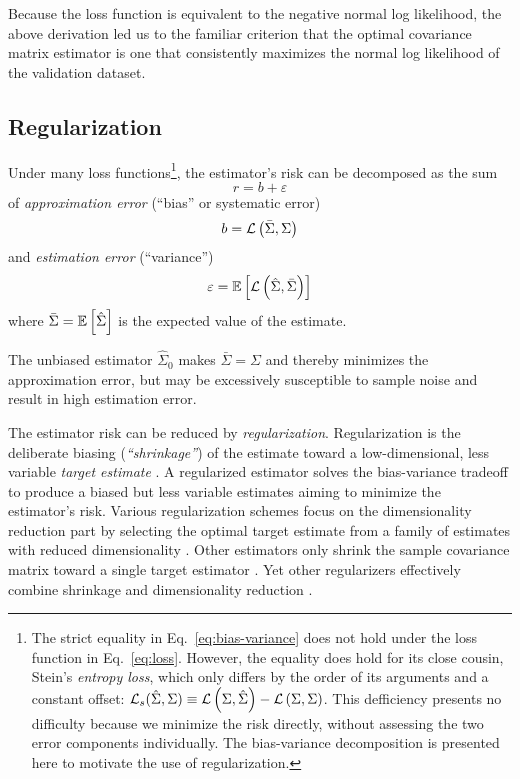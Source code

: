 Because the loss function is equivalent to the negative normal log likelihood, the above derivation led us to the familiar criterion that the optimal covariance matrix estimator is one that consistently maximizes the normal log likelihood of the validation dataset.

\subsection*{Regularization}
Under many loss functions\footnote{
The strict equality in Eq.~\ref{eq:bias-variance} does not hold under the loss function in Eq.~\ref{eq:loss}. However, the equality does hold for its close cousin, Stein's \emph{entropy loss},  which only differs by the order of its arguments and a constant offset: $\mathcal L_s(\hat\Sigma,\Sigma) \equiv \mathcal L\left(\Sigma,\hat\Sigma\right) - \mathcal L\left(\Sigma,\Sigma\right)$. This defficiency presents no difficulty because we minimize the risk directly, without assessing the two error components individually. The bias-variance decomposition is presented here to motivate the use of regularization.}, 
the estimator's risk can be decomposed as the sum
\begin{equation}\label{eq:bias-variance}
r = b + \varepsilon
\end{equation}
of \emph{approximation error} (``bias'' or systematic error)
\begin{equation}
b = \mathcal L\left(\bar\Sigma,\Sigma\right)
\end{equation}
and \emph{estimation error} (``variance'') 
\begin{equation}
\varepsilon = \mathbb E\left[ \mathcal L\left(\hat\Sigma, \bar\Sigma\right)\right]
\end{equation}
where $\bar\Sigma = \mathbb E\left[ \hat\Sigma\right]$ is the expected value of the estimate. 

The unbiased estimator $\hat\Sigma_0$ makes $\bar\Sigma=\Sigma$ and thereby minimizes the approximation error, but may be excessively susceptible to sample noise and result in high estimation error.

The estimator risk can be reduced by \emph{regularization}. Regularization is the deliberate biasing (\emph{``shrinkage''}) of the estimate toward a low-dimensional, less variable \emph{target estimate} \cite{Bickel:2006,Ledoit:2004}. A regularized estimator solves the bias-variance tradeoff to produce a biased but less variable estimates aiming to minimize the estimator's risk.  Various regularization schemes focus on the dimensionality reduction part  by selecting the optimal target estimate from a family of estimates with reduced dimensionality \cite{findit}.  Other estimators only shrink the sample covariance matrix toward a single target estimator \cite{Schafer:2005}. Yet other regularizers effectively combine shrinkage and dimensionality reduction \cite{findit}.

